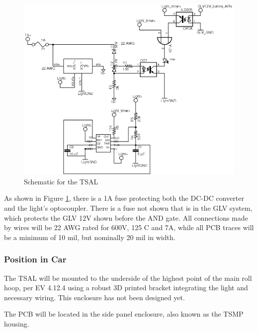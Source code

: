 \documentclass{article}
\begin{document}
            \begin{figure}[H]
            \centering
            \includegraphics[width = 0.7 \textwidth]{TSAL_FSAE}
            \caption{Schematic for the TSAL}
            \label{TSALschem}
            \end{figure}
            
            As shown in Figure \ref{TSALschem}, there is a 1A fuse protecting both the DC-DC converter and the light's optocoupler. There is a fuse not shown that is in the GLV system, which protects the GLV 12V shown before the AND gate. All connections made by wires will be 22 AWG rated for 600V, 125 \degree C and 7A, while all PCB traces will be a minimum of 10 mil, but nominally 20 mil in width. 


        \subsubsection{Position in Car}

            The TSAL will be mounted to the underside of the highest point of the main roll hoop, per EV 4.12.4 using a robust 3D printed bracket integrating the light and necessary wiring. This enclosure has not been designed yet.
            
            The PCB will be located in the side panel enclosure, also known as the TSMP housing. 
\end{document}
